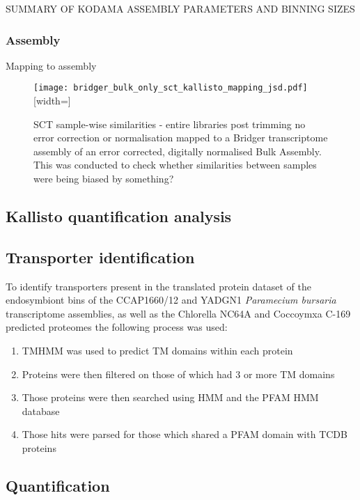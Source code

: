 SUMMARY OF KODAMA ASSEMBLY PARAMETERS
AND BINNING SIZES


\subsubsection{Assembly}

Mapping to assembly

\begin{figure}
	\texttt{[image: bridger\_bulk\_only\_sct\_kallisto\_mapping\_jsd.pdf]}[width=\textwidth]
	\caption{SCT sample-wise similarities - entire libraries post trimming
		no error correction or normalisation mapped to a Bridger transcriptome 
		assembly of an error corrected, digitally normalised Bulk Assembly.  
		This was conducted to check whether similarities between samples
		were being biased by something?}
	\label{fig:bridger_bulk_heatmap}
\end{figure}




\subsection{Kallisto quantification analysis}





\subsection{Transporter identification}

To identify transporters present in the translated protein dataset of the 
endosymbiont bins of the CCAP1660/12 and YADGN1 
\textit{Paramecium bursaria} transcriptome assemblies, as well as the Chlorella NC64A 
and Coccoymxa C-169 predicted proteomes the following process was used:

\begin{enumerate}
        \item TMHMM was used to predict TM domains within each protein
        \item Proteins were then filtered on those of which had 3 or more TM domains
        \item Those proteins were then searched using HMM and the PFAM HMM database
        \item Those hits were parsed for those which shared a PFAM domain with TCDB proteins
\end{enumerate}

\subsection{Quantification}



